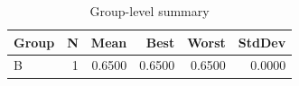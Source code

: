 \begin{table}[htbp]
\centering
\caption{Group-level summary}
\label{tab:group-summary}
\begin{tabular}{lrrrrr}
\toprule
\textbf{Group} & \textbf{N} & \textbf{Mean} & \textbf{Best} & \textbf{Worst} & \textbf{StdDev} \\
\midrule
B & 1 & 0.6500 & 0.6500 & 0.6500 & 0.0000 \\
\bottomrule
\end{tabular}
\end{table}
